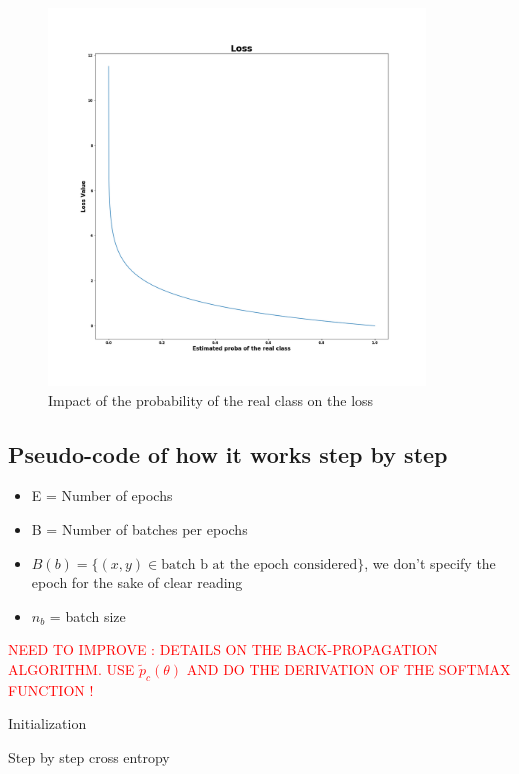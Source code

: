 \documentclass[11pt]{article}
\begin{document}
\begin{figure}[h]
    \centering
    \includegraphics[width=10cm]{crossentropy_1d.png}
    \caption{Impact of the probability of the real class on the loss}
    \label{fig:crossentropy_1d}
\end{figure}
\newpage




\subsection{Pseudo-code of how it works step by step}
\begin{itemize}
    \item E = Number of epochs 
    \item B = Number of batches per epochs
    \item $B(b) = \{(x,y) \in \text{batch b at the epoch considered}\}$, we don't specify the epoch for the sake of clear reading
    \item $n_b $ = batch size
\end{itemize}

\textcolor{red}{NEED TO IMPROVE : DETAILS ON THE BACK-PROPAGATION ALGORITHM.  USE $\tilde{p}_c(\theta)$ AND DO THE DERIVATION OF THE SOFTMAX FUNCTION ! }


\begin{tcolorbox}[colback = white, sharp corners=all]
\begin{algorithm}[H]
 Initialization\;
\caption{Step by step cross entropy}
\end{algorithm}
\end{tcolorbox}
\end{document}
